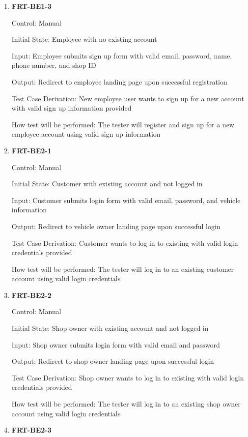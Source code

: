 \documentclass[12pt, titlepage]{article}
\begin{document}
\begin{enumerate}
	\item \textbf{FRT-BE1-3}

	      Control: Manual

	      Initial State: Employee with no existing account

	      Input: Employee submits sign up form with valid email, password, name, phone number, and shop ID

	      Output: Redirect to employee landing page upon successful registration

	      Test Case Derivation: New employee user wants to sign up for a new account with valid sign up
	      information provided

	      How test will be performed: The tester will register and sign up for a new employee account using
	      valid sign up information

	\item \textbf{FRT-BE2-1}

	      Control: Manual

	      Initial State: Customer with existing account and not logged in

	      Input: Customer submits login form with valid email, password, and vehicle information

	      Output: Redirect to vehicle owner landing page upon successful login

	      Test Case Derivation: Customer wants to log in to existing with valid login credentials provided

	      How test will be performed: The tester will log in to an existing customer account using valid
	      login credentials

	\item \textbf{FRT-BE2-2}

	      Control: Manual

	      Initial State: Shop owner with existing account and not logged in

	      Input: Shop owner submits login form with valid email and password

	      Output: Redirect to shop owner landing page upon successful login

	      Test Case Derivation: Shop owner wants to log in to existing with valid login credentials provided

	      How test will be performed: The tester will log in to an existing shop owner account using valid
	      login credentials

	\item \textbf{FRT-BE2-3}


\end{enumerate}
\end{document}
